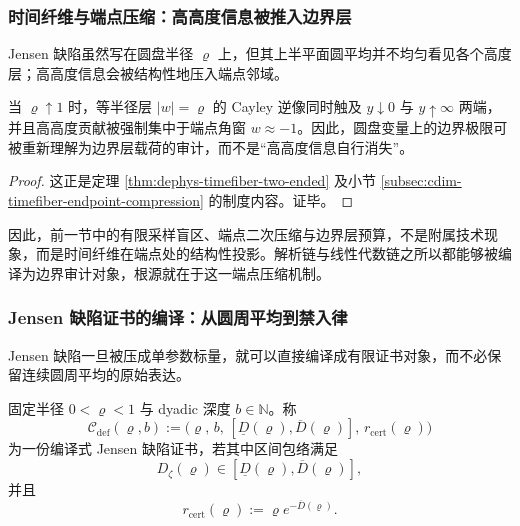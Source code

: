 \subsubsection{时间纤维与端点压缩：高高度信息被推入边界层}\label{subsubsec:typed-address-biaxial-completion-time-fiber-endpoint-compression}
Jensen 缺陷虽然写在圆盘半径 \(\varrho\) 上，但其上半平面圆平均并不均匀看见各个高度层；高高度信息会被结构性地压入端点邻域。

\begin{proposition}[时间纤维的端点压缩语义]\label{prop:typed-address-biaxial-completion-time-fiber-endpoint-compression}
当 \(\varrho\uparrow 1\) 时，等半径层 \(|w|=\varrho\) 的 Cayley 逆像同时触及 \(y\downarrow 0\) 与 \(y\uparrow \infty\) 两端，并且高高度贡献被强制集中于端点角窗 \(w\approx -1\)。因此，圆盘变量上的边界极限可被重新理解为边界层载荷的审计，而不是“高高度信息自行消失”。
\end{proposition}
\begin{proof}
这正是定理 \ref{thm:dephys-timefiber-two-ended} 及小节 \ref{subsec:cdim-timefiber-endpoint-compression} 的制度内容。证毕。
\end{proof}

因此，前一节中的有限采样盲区、端点二次压缩与边界层预算，不是附属技术现象，而是时间纤维在端点处的结构性投影。解析链与线性代数链之所以都能够被编译为边界审计对象，根源就在于这一端点压缩机制。

\subsubsection{Jensen 缺陷证书的编译：从圆周平均到禁入律}\label{subsubsec:typed-address-biaxial-completion-compiled-defect-certificate}
Jensen 缺陷一旦被压成单参数标量，就可以直接编译成有限证书对象，而不必保留连续圆周平均的原始表达。

\begin{definition}\label{def:typed-address-biaxial-completion-compiled-defect-certificate}
固定半径 \(0<\varrho<1\) 与 dyadic 深度 \(b\in\mathbb N\)。称
\[
\mathcal C_{\mathrm{def}}(\varrho,b)
:=
\bigl(
\varrho,\,
b,\,
[\underline D(\varrho),\overline D(\varrho)],\,
r_{\mathrm{cert}}(\varrho)
\bigr)
\]
为一份编译式 Jensen 缺陷证书，若其中区间包络满足
\[
D_{\zeta}(\varrho)\in[\underline D(\varrho),\overline D(\varrho)],
\]
并且
\[
r_{\mathrm{cert}}(\varrho):=\varrho e^{-\overline D(\varrho)}.
\]
\end{definition}

